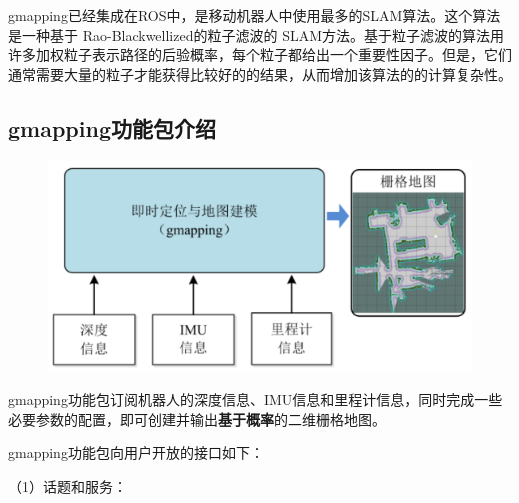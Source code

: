 \documentclass[9pt, oneside]{book}
\begin{document}
gmapping已经集成在ROS中，是移动机器人中使用最多的SLAM算法。这个算法是一种基于 Rao-Blackwellized的粒子滤波的 SLAM方法。基于粒子滤波的算法用许多加权粒子表示路径的后验概率，每个粒子都给出一个重要性因子。但是，它们通常需要大量的粒子才能获得比较好的的结果，从而增加该算法的的计算复杂性。

\subsection{gmapping功能包介绍}

\begin{figure}[H]
    \centering
    \includegraphics[width=0.5\linewidth]{image/gmapping框架.png}
\end{figure}

gmapping功能包订阅机器人的深度信息、IMU信息和里程计信息，同时完成一些必要参数的配置，即可创建并输出\textbf{基于概率}的二维栅格地图。

gmapping功能包向用户开放的接口如下：

（1）话题和服务：
\end{document}
